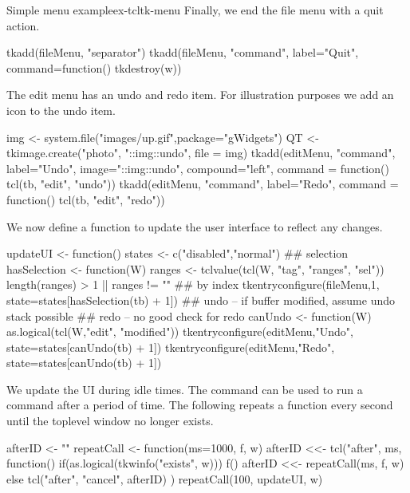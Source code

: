 \begin{example}{Simple menu example}{ex-tcltk-menu}
Finally, we end the file menu with a quit action. 
\begin{Schunk}
\begin{Sinput}
 tkadd(fileMenu, "separator")
 tkadd(fileMenu, "command", label="Quit", command=function() tkdestroy(w))
\end{Sinput}
\end{Schunk}

The edit menu has an undo and redo item. For illustration purposes we add an icon to the undo item.
\begin{Schunk}
\begin{Sinput}
 img <- system.file("images/up.gif",package="gWidgets")
 QT <- tkimage.create("photo", "::img::undo", 
                      file = img)
 tkadd(editMenu, "command", label="Undo",
       image="::img::undo", compound="left",
       command = function() tcl(tb, "edit", "undo"))
 tkadd(editMenu, "command", label="Redo",
       command = function() tcl(tb, "edit", "redo"))
\end{Sinput}
\end{Schunk}

We now define a function to update the user interface to reflect any changes.
\begin{Schunk}
\begin{Sinput}
 updateUI <- function() {
   states <- c("disabled","normal")
   ## selection
   hasSelection <- function(W) {
     ranges <- tclvalue(tcl(W, "tag", "ranges", "sel"))
     length(ranges) > 1 || ranges != ""
   }
   ## by index  
   tkentryconfigure(fileMenu,1,  state=states[hasSelection(tb) + 1]) 
   ## undo -- if buffer modified, assume undo stack possible
   ## redo -- no good check for redo
   canUndo <- function(W) as.logical(tcl(W,"edit", "modified"))
   tkentryconfigure(editMenu,"Undo", state=states[canUndo(tb) + 1])
   tkentryconfigure(editMenu,"Redo", state=states[canUndo(tb) + 1])
 }
\end{Sinput}
\end{Schunk}
We update the UI during idle times. The  command can be used to run a command after a period of time. The following repeats a function every second until the toplevel window no longer exists.
\begin{Schunk}
\begin{Sinput}
 afterID <- ""
 repeatCall <- function(ms=1000, f, w) {
   afterID <<- tcl("after", ms, function() {
     if(as.logical(tkwinfo("exists", w))) {
       f()
       afterID <<- repeatCall(ms, f, w)
     } else {
       tcl("after", "cancel", afterID)
     }
   })
 }
 repeatCall(100, updateUI, w)
\end{Sinput}
\end{Schunk}


\end{example}
